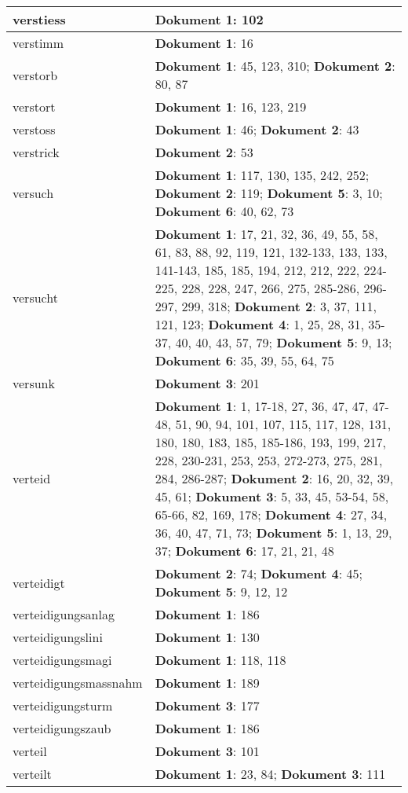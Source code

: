 \documentclass[a5paper]{article}
\begin{document}
\begin{longtable}[l]{|l|p{3in}|}
\hline
verstiess & \textbf{Dokument 1}: 102 \\
\hline
verstimm & \textbf{Dokument 1}: 16 \\
\hline
verstorb & \textbf{Dokument 1}: 45, 123, 310; \textbf{Dokument 2}: 80, 87 \\
\hline
verstort & \textbf{Dokument 1}: 16, 123, 219 \\
\hline
verstoss & \textbf{Dokument 1}: 46; \textbf{Dokument 2}: 43 \\
\hline
verstrick & \textbf{Dokument 2}: 53 \\
\hline
versuch & \textbf{Dokument 1}: 117, 130, 135, 242, 252; \textbf{Dokument 2}: 119; \textbf{Dokument 5}: 3, 10; \textbf{Dokument 6}: 40, 62, 73 \\
\hline
versucht & \textbf{Dokument 1}: 17, 21, 32, 36, 49, 55, 58, 61, 83, 88, 92, 119, 121, 132-133, 133, 133, 141-143, 185, 185, 194, 212, 212, 222, 224-225, 228, 228, 247, 266, 275, 285-286, 296-297, 299, 318; \textbf{Dokument 2}: 3, 37, 111, 121, 123; \textbf{Dokument 4}: 1, 25, 28, 31, 35-37, 40, 40, 43, 57, 79; \textbf{Dokument 5}: 9, 13; \textbf{Dokument 6}: 35, 39, 55, 64, 75 \\
\hline
versunk & \textbf{Dokument 3}: 201 \\
\hline
verteid & \textbf{Dokument 1}: 1, 17-18, 27, 36, 47, 47, 47-48, 51, 90, 94, 101, 107, 115, 117, 128, 131, 180, 180, 183, 185, 185-186, 193, 199, 217, 228, 230-231, 253, 253, 272-273, 275, 281, 284, 286-287; \textbf{Dokument 2}: 16, 20, 32, 39, 45, 61; \textbf{Dokument 3}: 5, 33, 45, 53-54, 58, 65-66, 82, 169, 178; \textbf{Dokument 4}: 27, 34, 36, 40, 47, 71, 73; \textbf{Dokument 5}: 1, 13, 29, 37; \textbf{Dokument 6}: 17, 21, 21, 48 \\
\hline
verteidigt & \textbf{Dokument 2}: 74; \textbf{Dokument 4}: 45; \textbf{Dokument 5}: 9, 12, 12 \\
\hline
verteidigungsanlag & \textbf{Dokument 1}: 186 \\
\hline
verteidigungslini & \textbf{Dokument 1}: 130 \\
\hline
verteidigungsmagi & \textbf{Dokument 1}: 118, 118 \\
\hline
verteidigungsmassnahm & \textbf{Dokument 1}: 189 \\
\hline
verteidigungsturm & \textbf{Dokument 3}: 177 \\
\hline
verteidigungszaub & \textbf{Dokument 1}: 186 \\
\hline
verteil & \textbf{Dokument 3}: 101 \\
\hline
verteilt & \textbf{Dokument 1}: 23, 84; \textbf{Dokument 3}: 111 \\

\end{longtable}
\end{document}

